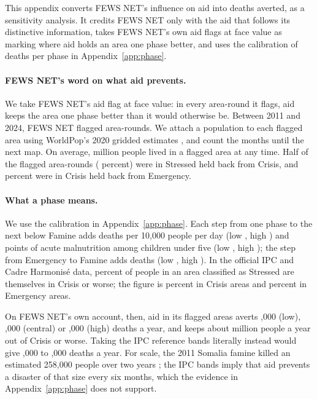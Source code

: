 \documentclass[11pt]{article}
\begin{document}
\begin{appendices}
This appendix converts FEWS NET's influence on aid into deaths averted, as a sensitivity analysis. It credits FEWS NET only with the aid that follows its distinctive information, takes FEWS NET's own aid flags at face value as marking where aid holds an area one phase better, and uses the calibration of deaths per phase in Appendix~\ref{app:phase}.

\paragraph{FEWS NET's word on what aid prevents.} We take FEWS NET's aid flag at face value: in every area-round it flags, aid keeps the area one phase better than it would otherwise be. Between 2011 and 2024, FEWS NET flagged \bcFlaggedRounds{} area-rounds. We attach a population to each flagged area using WorldPop's 2020 gridded estimates \citep{worldpop2020}, and count the months until the next map. On average, \bcPeople{} million people lived in a flagged area at any time. Half of the flagged area-rounds (\bcPhaseTwo{} percent) were in Stressed held back from Crisis, and \bcPhaseThree{} percent were in Crisis held back from Emergency.

\paragraph{What a phase means.} We use the calibration in Appendix~\ref{app:phase}. Each step from one phase to the next below Famine adds \calCdrMid{} deaths per 10,000 people per day (low \calCdrLo{}, high \calCdrHi{}) and \calGamMid{} points of acute malnutrition among children under five (low \calGamLo{}, high \calGamHi{}); the step from Emergency to Famine adds \calFamMid{} deaths (low \calFamLo{}, high \calFamHi{}). In the official IPC and Cadre Harmonis\'e data, \bcSthreeStressed{} percent of people in an area classified as Stressed are themselves in Crisis or worse; the figure is \bcSthreeCrisis{} percent in Crisis areas and \bcSthreeEmerg{} percent in Emergency areas.

On FEWS NET's own account, then, aid in its flagged areas averts \bcGrossCons{},000 (low), \bcGrossMid{},000 (central) or \bcGrossUp{},000 (high) deaths a year, and keeps about \bcGrossCrisis{} million people a year out of Crisis or worse. Taking the IPC reference bands literally instead would give \ipcGrossCons{},000 to \ipcGrossUp{},000 deaths a year. For scale, the 2011 Somalia famine killed an estimated 258,000 people over two years \citep{checchi2013}; the IPC bands imply that aid prevents a disaster of that size every six months, which the evidence in Appendix~\ref{app:phase} does not support.


\end{appendices}
\end{document}
